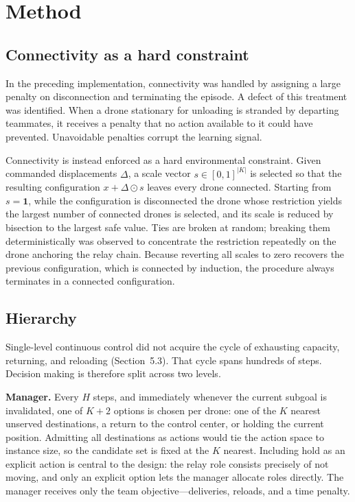 \documentclass[12pt]{article}
\begin{document}
\section{Method}

\subsection{Connectivity as a hard constraint}

In the preceding implementation, connectivity was handled by assigning a large penalty on
disconnection and terminating the episode. A defect of this treatment was identified. When a drone
stationary for unloading is stranded by departing teammates, it receives a penalty that no action
available to it could have prevented. Unavoidable penalties corrupt the learning signal.

Connectivity is instead enforced as a hard environmental constraint. Given commanded displacements
$\Delta$, a scale vector $s \in [0,1]^{|K|}$ is selected so that the resulting configuration
$x + \Delta \odot s$ leaves every drone connected. Starting from $s = \mathbf{1}$, while the
configuration is disconnected the drone whose restriction yields the largest number of connected
drones is selected, and its scale is reduced by bisection to the largest safe value. Ties are
broken at random; breaking them deterministically was observed to concentrate the restriction
repeatedly on the drone anchoring the relay chain. Because reverting all scales to zero recovers
the previous configuration, which is connected by induction, the procedure always terminates in a
connected configuration.

\subsection{Hierarchy}

Single-level continuous control did not acquire the cycle of exhausting capacity, returning, and
reloading (Section~5.3). That cycle spans hundreds of steps. Decision making is therefore split
across two levels.

\textbf{Manager.} Every $H$ steps, and immediately whenever the current subgoal is invalidated,
one of $K+2$ options is chosen per drone: one of the $K$ nearest unserved destinations, a return to
the control center, or holding the current position. Admitting all destinations as actions would
tie the action space to instance size, so the candidate set is fixed at the $K$ nearest. Including
hold as an explicit action is central to the design: the relay role consists precisely of not
moving, and only an explicit option lets the manager allocate roles directly. The manager receives
only the team objective---deliveries, reloads, and a time penalty.
\end{document}
